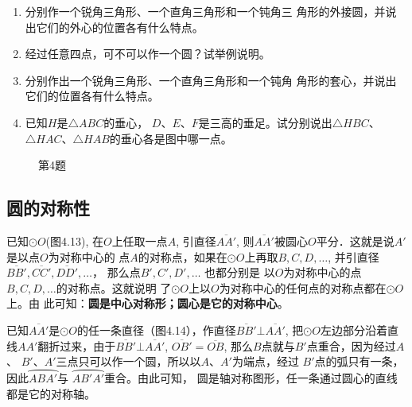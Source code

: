 \begin{ex}
\begin{enumerate}
    \item 分别作一个锐角三角形、一个直角三角形和一个钝角三
    角形的外接圆，并说出它们的外心的位置各有什么特点。
    \item 经过任意四点，可不可以作一个圆？试举例说明。
    \item 分别作出一个锐角三角形、一个直角三角形和一个钝角
    角形的套心，并说出它们的位置各有什么特点。
    \item 已知$H$是$\triangle ABC$的垂心，
    $D$、$E$、$F$是三高的垂足。试分别说出$\triangle HBC$、$\triangle HAC$、$\triangle HAB$的垂心各是图中哪一点。
\end{enumerate}
\end{ex}

\begin{figure}[htp]
    \centering
{}
    \caption*{第4题}
\end{figure}

\subsection{圆的对称性}
已知$\odot O$(图4.13), 在$O$上任取一点$A$, 引直径$\overline{AA'}$, 
则$\overline{AA'}$被圆心$O$平分．这就是说$A'$是以点$O$为对称中心的
点$A$的对称点，如果在$\odot O$上再取$B,C,D,\ldots$, 并引直径
$\overline{BB'},\overline{CC'},\overline{DD'},\ldots$， 那么点$B',C',D',\ldots$ 也都分别是
以$O$为对称中心的点$B,C,D,\ldots$的对称点。这就说明
了$\odot O$上以$O$为对称中心的任何点的对称点都在$\odot O$上。由
此可知：\textbf{圆是中心对称形；圆心是它的对称中心}。

已知$\overline{AA'}$是$\odot O$的任一条直径（图4.14），作直径$\overline{BB'}\bot 
\overline{AA'}$, 把$\odot O$左边部分沿着直线$AA'$翻折过来，由于$\overline{BB'}\bot \overline{AA'}$, $\overline{OB'}=\overline{OB}$, 那么$B$点就与$B'$点重合，因为经过$A$、
$B'$、$A'$三点只可以作一个圆，所以以$A$、$A'$为端点，经过
$B'$点的弧只有一条，因此$\wideparen{ABA'}$与
$\wideparen{AB'A'}$重合。由此可知，
圆是轴对称图形，任一条通过圆心的直线都是它的对称轴。

